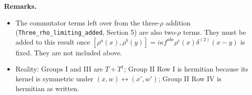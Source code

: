 \documentclass[9pt]{article}
\numberwithin{equation}{section}
\begin{document}
\textbf{Remarks.}
\begin{itemize}
\item The commutator terms left over from the three-$\rho$ addition (\texttt{Three\_rho\_limiting\_added}, Section 5) are also two-$\rho$ terms. They must be added to this result once $[\rho^{a}(x),\rho^{b}(y)]=i\kappa f^{abc}\rho^{c}(x)\delta^{(2)}(x-y)$ is fixed. They are not included above.
\item Reality: Groups I and III are $T+T^{\dagger}$; Group II Row I is hermitian because its kernel is symmetric under $(x,w)\leftrightarrow(x',w')$; Group II Row IV is hermitian as written.
\end{itemize}
\end{document}
